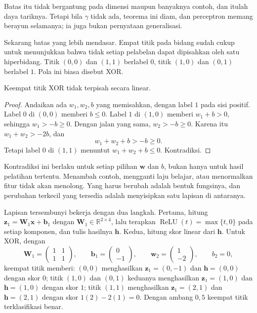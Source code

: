 Batas itu tidak bergantung pada dimensi maupun banyaknya contoh, dan itulah daya tariknya. Tetapi bila $\gamma$ tidak ada, teorema ini diam, dan perceptron memang berayun selamanya; ia juga bukan pernyataan generalisasi.

Sekarang batas yang lebih mendasar. Empat titik pada bidang sudah cukup untuk menunjukkan
bahwa tidak setiap pelabelan dapat dipisahkan oleh satu hiperbidang. Titik $(0,0)$ dan
$(1,1)$ berlabel $0$, titik $(1,0)$ dan $(0,1)$ berlabel $1$. Pola ini biasa disebut XOR.

\begin{proposisi}
Keempat titik XOR tidak terpisah secara linear.
\end{proposisi}

\begin{proof}
Andaikan ada $w_{1},w_{2},b$ yang memisahkan, dengan label $1$ pada sisi positif. Label $0$
di $(0,0)$ memberi $b\le0$. Label $1$ di $(1,0)$ memberi $w_{1}+b>0$, sehingga
$w_{1}>-b\ge0$. Dengan jalan yang sama, $w_{2}>-b\ge0$. Karena itu $w_{1}+w_{2}>-2b$, dan
\[
  w_{1}+w_{2}+b>-b\ge0 .
\]
Tetapi label $0$ di $(1,1)$ menuntut $w_{1}+w_{2}+b\le0$. Kontradiksi.
\end{proof}

Kontradiksi ini berlaku untuk setiap pilihan $\mathbf{w}$ dan $b$, bukan hanya untuk hasil
pelatihan tertentu. Menambah contoh, mengganti laju belajar, atau menormalkan fitur tidak
akan menolong. Yang harus berubah adalah bentuk fungsinya, dan perubahan terkecil yang
tersedia adalah menyisipkan satu lapisan di antaranya.


Lapisan tersembunyi bekerja dengan dua langkah. Pertama, hitung
$\mathbf{z}_{1}=\mathbf{W}_{1}\mathbf{x}+\mathbf{b}_{1}$ dengan
$\mathbf{W}_{1}\in\mathbb{R}^{2\times4}$, lalu terapkan
$\operatorname{ReLU}(t)=\max\{t,0\}$ pada setiap komponen, dan tulis hasilnya $\mathbf{h}$.
Kedua, hitung skor linear dari $\mathbf{h}$. Untuk XOR, dengan
\[
  \mathbf{W}_{1}=\begin{pmatrix}1&1\\1&1\end{pmatrix},\qquad
  \mathbf{b}_{1}=\begin{pmatrix}0\\-1\end{pmatrix},\qquad
  \mathbf{w}_{2}=\begin{pmatrix}1\\-2\end{pmatrix},\qquad b_{2}=0,
\]
keempat titik memberi: $(0,0)$ menghasilkan $\mathbf{z}_{1}=(0,-1)$ dan
$\mathbf{h}=(0,0)$ dengan skor $0$; titik $(1,0)$ dan $(0,1)$ keduanya menghasilkan
$\mathbf{z}_{1}=(1,0)$ dan $\mathbf{h}=(1,0)$ dengan skor $1$; titik $(1,1)$ menghasilkan
$\mathbf{z}_{1}=(2,1)$ dan $\mathbf{h}=(2,1)$ dengan skor $1(2)-2(1)=0$. Dengan ambang
$0{,}5$ keempat titik terklasifikasi benar.


